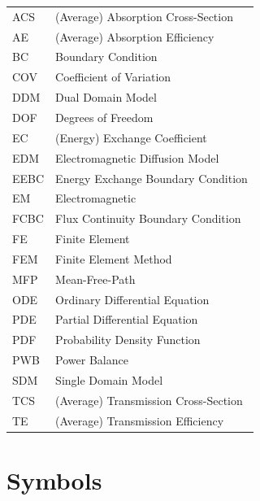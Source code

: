 \documentclass[a4paper]{article}
\numberwithin{equation}{section}
\begin{document}
\begin{supertabular}{m{2cm}l}
ACS              & (Average) Absorption Cross-Section  \\
AE               &(Average) Absorption Efficiency      \\
BC               &Boundary Condition                   \\
COV              &Coefficient of Variation             \\
DDM              &Dual Domain Model                    \\
DOF              &Degrees of Freedom                   \\
EC               &(Energy) Exchange Coefficient        \\
EDM              &Electromagnetic Diffusion Model      \\
EEBC             &Energy Exchange Boundary Condition   \\
EM               &Electromagnetic                      \\
FCBC             &Flux Continuity Boundary Condition   \\
FE               &Finite Element                       \\
FEM              &Finite Element Method                \\
MFP              &Mean-Free-Path                       \\
ODE              &Ordinary Differential Equation       \\
PDE              &Partial Differential Equation        \\
PDF              &Probability Density Function         \\
PWB              &Power Balance                        \\
SDM              &Single Domain Model                  \\
TCS              &(Average) Transmission Cross-Section \\
TE               &(Average) Transmission Efficiency    \\
\end{supertabular}

\newpage
\section*{Symbols}
\label{sc:symbols}
\end{document}
